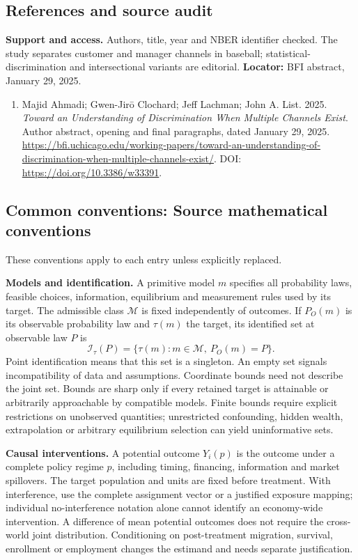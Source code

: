 \documentclass[11pt,a4paper]{article}
\begin{document}
\subsection*{References and source audit}
\textbf{Support and access.} Authors, title, year and NBER identifier checked. The study separates customer and manager channels in baseball; statistical-discrimination and intersectional variants are editorial. \textbf{Locator:} BFI abstract, January 29, 2025.
\begin{enumerate}\raggedright
\item\hypertarget{definitions:source:30007638:1}{} Majid Ahmadi; Gwen-Jir\={o} Clochard; Jeff Lachman; John A. List. 2025. \emph{Toward an Understanding of Discrimination When Multiple Channels Exist}. Author abstract, opening and final paragraphs, dated January 29, 2025.
\url{https://bfi.uchicago.edu/working-papers/toward-an-understanding-of-discrimination-when-multiple-channels-exist/}.
DOI: \url{https://doi.org/10.3386/w33391}.
\end{enumerate}

\subsection*{Common conventions: Source mathematical conventions}

These conventions apply to each entry unless explicitly replaced.

\textbf{Models and identification.} A primitive model \(m\) specifies all probability laws, feasible choices, information, equilibrium and measurement rules used by its target. The admissible class \(\mathcal M\) is fixed independently of outcomes. If \(P_O(m)\) is its observable probability law and \(\tau(m)\) the target, its identified set at observable law \(P\) is
\[
 \mathcal I_\tau(P)=\{\tau(m):m\in\mathcal M,\ P_O(m)=P\}.
\]
Point identification means that this set is a singleton. An empty set signals incompatibility of data and assumptions. Coordinate bounds need not describe the joint set. Bounds are sharp only if every retained target is attainable or arbitrarily approachable by compatible models. Finite bounds require explicit restrictions on unobserved quantities; unrestricted confounding, hidden wealth, extrapolation or arbitrary equilibrium selection can yield uninformative sets.

\textbf{Causal interventions.} A potential outcome \(Y_i(p)\) is the outcome under a complete policy regime \(p\), including timing, financing, information and market spillovers. The target population and units are fixed before treatment. With interference, use the complete assignment vector or a justified exposure mapping; individual no-interference notation alone cannot identify an economy-wide intervention. A difference of mean potential outcomes does not require the cross-world joint distribution. Conditioning on post-treatment migration, survival, enrollment or employment changes the estimand and needs separate justification.
\end{document}
